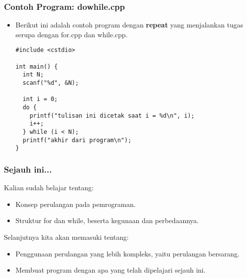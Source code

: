 \begin{frame}[fragile]
\frametitle{Contoh Program: dowhile.cpp}
\begin{itemize}
  \item Berikut ini adalah contoh program dengan \textbf{repeat} yang menjalankan tugas serupa dengan for.cpp dan while.cpp.
\begin{lstlisting}
#include <cstdio>

int main() {
  int N;
  scanf("%d", &N);

  int i = 0;
  do {
    printf("tulisan ini dicetak saat i = %d\n", i);
    i++;
  } while (i < N);
  printf("akhir dari program\n");
}
\end{lstlisting}
\end{itemize}
\end{frame}

\begin{frame}
\frametitle{Sejauh ini...}
Kalian sudah belajar tentang:
\begin{itemize}
  \item Konsep perulangan pada pemrograman.
  \item Struktur for dan while, beserta kegunaan dan perbedaannya.
\end{itemize}
Selanjutnya kita akan memasuki tentang:
\begin{itemize}
  \item Penggunaan perulangan yang lebih kompleks, yaitu perulangan bersarang.
  \item Membuat program dengan apa yang telah dipelajari sejauh ini.
\end{itemize}
\end{frame}


